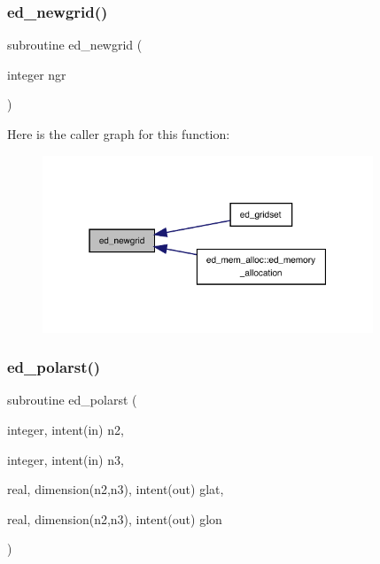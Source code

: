 \subsubsection{\texorpdfstring{ed\+\_\+newgrid()}{ed\_newgrid()}}
{\footnotesize\ttfamily subroutine ed\+\_\+newgrid (\begin{DoxyParamCaption}\item[{integer}]{ngr }\end{DoxyParamCaption})}

Here is the caller graph for this function\+:
\nopagebreak
\begin{figure}[H]
\begin{center}
\leavevmode
\includegraphics[width=280pt]{ed__grid_8f90_a91112e6806db1100d405228002308384_icgraph}
\end{center}
\end{figure}
\mbox{\label{ed__grid_8f90_a086bde332f24bfe809a5abbdeef98c55}} 
\subsubsection{\texorpdfstring{ed\+\_\+polarst()}{ed\_polarst()}}
{\footnotesize\ttfamily subroutine ed\+\_\+polarst (\begin{DoxyParamCaption}\item[{integer, intent(in)}]{n2,  }\item[{integer, intent(in)}]{n3,  }\item[{real, dimension(n2,n3), intent(out)}]{glat,  }\item[{real, dimension(n2,n3), intent(out)}]{glon }\end{DoxyParamCaption})}

